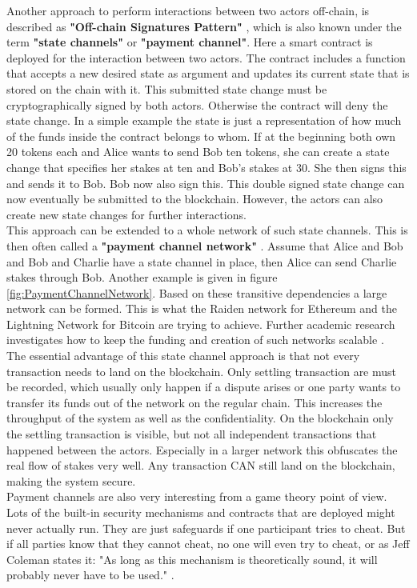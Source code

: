 \documentclass[a4paper,12pt]{scrartcl}
\begin{document}
Another approach to perform interactions between two actors off-chain, is described as \textbf{"Off-chain Signatures Pattern"} \cite{eberhardt2017or}, which is also known under the term \textbf{"state channels"} \cite{web13} or \textbf{"payment channel"}. Here a smart contract is deployed for the interaction between two actors. The contract includes a function that accepts a new desired state as argument and updates its current state that is stored on the chain with it. This submitted state change must be cryptographically signed by both actors. Otherwise the contract will deny the state change. In a simple example the state is just a representation of how much of the funds inside the contract belongs to whom. If at the beginning both own 20 tokens each and Alice wants to send Bob ten tokens, she can create a state change that specifies her stakes at ten and Bob's stakes at 30. She then signs this and sends it to Bob. Bob now also sign this. This double signed state change can now eventually be submitted to the blockchain. However, the actors can also create new state changes for further interactions.\\
This approach can be extended to a whole network of such state channels. This is then often called a \textbf{"payment channel network"} \cite{Malavolta2017}\cite{decker2015fast}. Assume that Alice and Bob and Bob and Charlie have a state channel in place, then Alice can send Charlie stakes through Bob. Another example is given in figure \ref{fig:PaymentChannelNetwork}. Based on these transitive dependencies a large network can be formed. This is what the Raiden network \cite{web17} for Ethereum and the Lightning Network \cite{web18} for Bitcoin are trying to achieve. Further academic research investigates how to keep the funding and creation of such networks scalable \cite{burchert2017scalable}\cite{khalil2017revive}.\\
The essential advantage of this state channel approach is that not every transaction needs to land on the blockchain. Only settling transaction are must be recorded, which usually only happen if a dispute arises or one party wants to transfer its funds out of the network on the regular chain. This increases the throughput of the system as well as the confidentiality. On the blockchain only the settling transaction is visible, but not all independent transactions that happened between the actors. Especially in a larger network this obfuscates the real flow of stakes very well. Any transaction CAN still land on the blockchain, making the system secure.\\
Payment channels are also very interesting from a game theory point of view. Lots of the built-in security mechanisms and contracts that are deployed might never actually run. They are just safeguards if one participant tries to cheat. But if all parties know that they cannot cheat, no one will even try to cheat, or as Jeff Coleman states it: "As long as this mechanism is theoretically sound, it will probably never have to be used." \cite{web13}.\\
\end{document}

